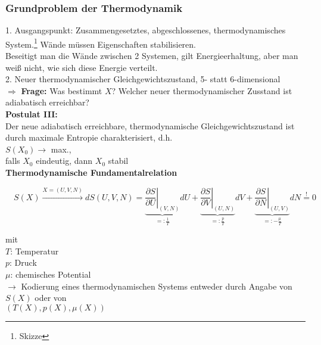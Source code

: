 \documentclass[10pt,article,colorback,accentcolor=tud9d]{scrartcl}
\begin{document}
 \subsubsection{Grundproblem der Thermodynamik}
 1. Ausgangspunkt: Zusammengesetztes, abgeschlossenes, thermodynamisches System.\footnote{Skizze} Wände müssen Eigenschaften stabilisieren.\\
 Beseitigt man die Wände zwischen  2 Systemen, gilt Energieerhaltung, aber man weiß nicht, wie sich diese Energie verteilt.\\
 2. Neuer thermodynamischer Gleichgewichtszustand, 5- statt 6-dimensional\\
 $\Rightarrow$ \textbf{Frage:} Was bestimmt $X$? Welcher neuer thermodynamischer Zusstand ist adiabatisch erreichbar?\\
 \textbf{Postulat III:}\\
Der neue adiabatisch erreichbare, thermodynamische Gleichgewichtszustand ist durch maximale Entropie charakterisiert, d.h.\\
 $S(X_0) \rightarrow$  max.,\\ 
falls $X_0$ eindeutig, dann $X_0$ stabil\\
 \textbf{Thermodynamische Fundamentalrelation}
\begin{fleqn}
\begin{equation}
 \quad S(X) \xrightarrow{X=(U,V,N)} dS(U,V,N)= 
\underbrace{\left.\frac{\partial S}{\partial U}\right|_{(V,N)}}
  _{=:\frac{1}{T}} dU  + 
\underbrace{\left.\frac{\partial S}{\partial V}\right|_{(U,N)}}
  _{=:\frac{p}{T}} dV + 
\underbrace{\left.\frac{\partial S}{\partial N}\right|
  _{(U,V)}}_{=:-\frac{\mu}{T}} dN \stackrel{!}{=}0
\end{equation}
\end{fleqn}
mit\\
$T$: Temperatur\\
$p$: Druck\\
$\mu$: chemisches Potential\\
$\rightarrow$ Kodierung eines thermodynamischen Systems entweder durch Angabe von\\
$S(X)$ oder von \\
$(T(X),p(X),\mu(X))$ \\
\end{document}
